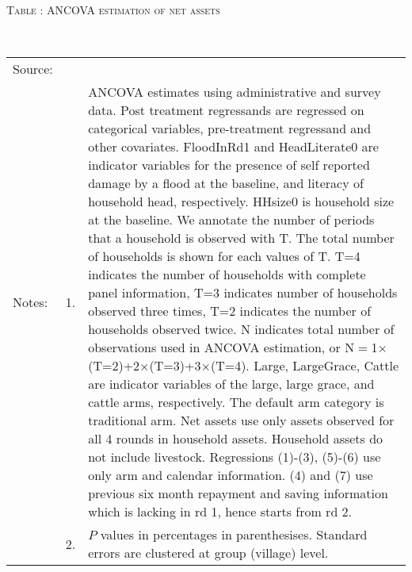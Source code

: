 \hspace{-1cm}\begin{minipage}[t]{14cm}
\hfil\textsc{\normalsize Table \thetable: ANCOVA estimation of net assets\label{tab ANCOVA net assets}}\\
\setlength{\tabcolsep}{1pt}
\setlength{\baselineskip}{8pt}
\renewcommand{\arraystretch}{.55}
\hfil{}\\
\renewcommand{\arraystretch}{.8}
\setlength{\tabcolsep}{1pt}
\begin{tabular}{>{\hfill\scriptsize}p{1cm}<{}>{\hfill\scriptsize}p{.25cm}<{}>{\scriptsize}p{12cm}<{\hfill}}
Source:& \multicolumn{2}{l}{\scriptsize Estimated with GUK administrative and survey data.}\\
Notes: & 1. & ANCOVA estimates using administrative and survey data. Post treatment regressands are regressed on categorical variables, pre-treatment regressand and other covariates. \textsf{FloodInRd1} and \textsf{HeadLiterate0} are indicator variables for the presence of self reported damage by a flood at the baseline, and literacy of household head, respectively. \textsf{HHsize0} is household size at the baseline. We annotate the number of periods that a household is observed with \textsf{T}. The total number of households is shown for each values of \textsf{T}. \textsf{T=4} indicates the number of households with complete panel information, \textsf{T=3} indicates number of households observed three times, \textsf{T=2} indicates the number of households observed twice. \textsf{N} indicates total number of observations used in ANCOVA estimation, or \textsf{N$=$1$\times$(T=2)+2$\times$(T=3)+3$\times$(T=4)}.  \textsf{Large}, \textsf{LargeGrace}, \textsf{Cattle} are indicator variables of the \textsf{large}, \textsf{large grace}, and \textsf{cattle} arms, respectively. The default arm category is \textsf{traditional} arm. Net assets use only assets observed for all 4 rounds in household assets. Household assets do not include livestock. Regressions (1)-(3), (5)-(6) use only arm and calendar information. (4) and (7) use previous six month repayment and saving information which is lacking in rd 1, hence starts from rd 2.\\
& 2. & $P$ values in percentages in parenthesises. Standard errors are clustered at group (village) level.
\end{tabular}
\end{minipage}

